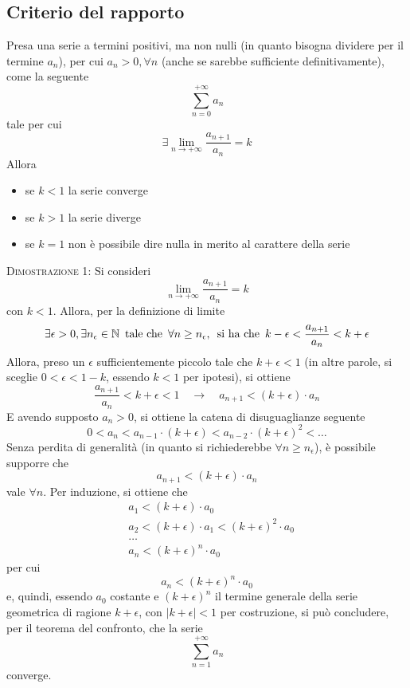 \documentclass[a4paper]{extarticle}
\begin{document}
\newpage
\noindent
\subsection{Criterio del rapporto}
Presa una serie a termini positivi, ma non nulli (in quanto bisogna dividere per il termine $a_n$), per cui $a_n>0, \forall n$ (anche se sarebbe sufficiente definitivamente), come la seguente
\[\sum_{n=0}^{+\infty} a_n\]
tale per cui
\[\exists \lim_{n \to +\infty} \frac{a_{n+1}}{a_n} = k\]
Allora
\begin{itemize}
    \item se $k < 1$ la serie converge
    \item se $k > 1$ la serie diverge
    \item se $k = 1$ non è possibile dire nulla in merito al carattere della serie
\end{itemize}

\vspace{2em}
\noindent
\normalfont \normalsize
\textsc{Dimostrazione 1}: Si consideri 
\[\lim_{n \to +\infty} \frac{a_{n+1}}{a_n}=k\]
con $k<1$. Allora, per la definizione di limite
\[\exists \epsilon > 0, \exists n_\epsilon \in \mathbb{N} \hspace{0.5em} \text{tale che} \hspace{0.5em} \forall n \geq n_\epsilon, \hspace{0.5em} \text{si ha che} \hspace{0.5em} k - \epsilon < \frac{a_{n+1}}{a_n} < k+\epsilon\]
Allora, preso un $\epsilon$ sufficientemente piccolo tale che $k+\epsilon<1$ (in altre parole, si sceglie $0 < \epsilon < 1-k$, essendo $k<1$ per ipotesi), si ottiene
\[\frac{a_{n+1}}{a_n} < k+\epsilon < 1 \hspace{1em} \rightarrow \hspace{1em} a_{n+1} < (k+\epsilon) \cdot a_n\]
E avendo supposto $a_n>0$, si ottiene la catena di disuguaglianze seguente
\[0 < a_n < a_{n-1} \cdot (k+\epsilon) <  a_{n-2} \cdot (k+\epsilon)^2 < \dots\]
Senza perdita di generalità (in quanto si richiederebbe $\forall n \geq n_\epsilon$), è possibile supporre che
\[a_{n+1} < (k+\epsilon) \cdot a_n\]
vale $\forall n$. Per induzione, si ottiene che
\begin{align*}
    &a_1 < (k+\epsilon) \cdot a_0\\
    &a_2 < (k+\epsilon) \cdot a_1 < (k+\epsilon)^2 \cdot a_0\\
    &\dots\\
    &a_n < (k+\epsilon)^n \cdot a_0
\end{align*}
per cui
\[a_n < (k+\epsilon)^n \cdot a_0\]
e, quindi, essendo $a_0$ costante e $(k+\epsilon)^n$ il termine generale della serie geometrica di ragione $k+\epsilon$, con $\left \vert k+\epsilon \right \vert < 1$ per costruzione, si può concludere, per il teorema del confronto, che la serie
\[\sum_{n=1}^{+\infty} a_n\]
converge.
\end{document}
